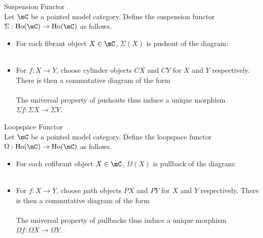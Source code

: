 \documentclass[a4paper]{article}
\begin{document}
\begin{defn}{Suspension Functor}{}\\ Let $\mC$ be a pointed model category. Define the suspension functor $\Sigma:\text{Ho}(\mC)\to\text{Ho}(\mC)$ as follows. 
\begin{itemize}
\item For each fibrant object $X\in\mC$, $\Sigma(X)$ is pushout of the diagram: \\
\\
\item For $f:X\to Y$, choose cylinder objects $CX$ and $CY$ for $X$ and $Y$ respectively. There is then a commutative diagram of the form \\
\\
The universal property of pushouts thus induce a unique morphism $\Sigma f:\Sigma X\to\Sigma Y$. 
\end{itemize}
\end{defn}

\begin{defn}{Loopspace Functor}{}\\ Let $\mC$ be a pointed model category. Define the loopspace functor $\Omega:\text{Ho}(\mC)\to\text{Ho}(\mC)$ as follows. 
\begin{itemize}
\item For each cofibrant object $X\in\mC$, $\Omega(X)$ is pullback of the diagram: \\
\\
\item For $f:X\to Y$, choose path objects $PX$ and $PY$ for $X$ and $Y$ respectively. There is then a commutative diagram of the form \\
\\
The universal property of pullbacks thus induce a unique morphism $\Omega f:\Omega X\to\Omega Y$. 
\end{itemize}
\end{defn}
\end{document}
